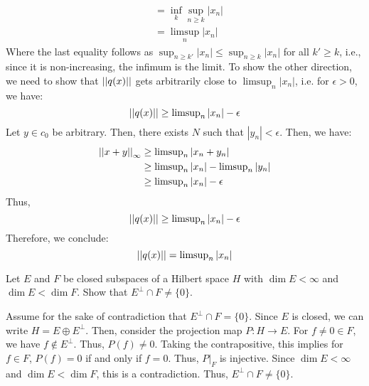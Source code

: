 \documentclass[12pt]{article}
\begin{document}
\begin{solution}
\begin{enumerate}
\begin{align*}
            &= \inf_k \sup_{n \geq k} |x_n| \\
            &= \limsup_n |x_n|
        \end{align*}
        Where the last equality follows as $\sup_{n \geq k'} |x_n| \leq \sup_{n \geq k} |x_n|$ for all $k' \geq k$, i.e., since it is non-increasing, the infimum is the limit.  \bbni
        To show the other direction, we need to show that $\left\vert\left\vert q(x)\right\vert\right\vert$ gets arbitrarily close to $\limsup_n |x_n|$, i.e. for $\epsilon > 0$, we have: 
        \[ \left\vert\left\vert q(x)\right\vert\right\vert \geq \operatorname{limsup}_n |x_n| - \epsilon\]
        Let $y \in c_0$ be arbitrary. Then, there exists $N$ such that $|y_n| < \epsilon$. Then, we have:
        \begin{align*}
            \left\vert\left\vert x+y\right\vert\right\vert_\infty &\geq \operatorname{limsup}_n |x_n + y_n| \\
            &\geq \operatorname{limsup}_n |x_n| - \operatorname{limsup}_n |y_n| \\
            &\geq \operatorname{limsup}_n |x_n| - \epsilon
        \end{align*}
        Thus,
        \[ \left\vert\left\vert q(x)\right\vert\right\vert \geq \operatorname{limsup}_n |x_n| - \epsilon\]
        Therefore, we conclude:
        \[ \left\vert\left\vert q(x)\right\vert\right\vert = \operatorname{limsup}_n |x_n|\]
    \end{enumerate}
\end{solution}
\newpage

\begin{problem}{5}
    Let $E$ and $F$ be closed subspaces of a Hilbert space $H$ with $\dim E < \infty$ and $\dim E < \dim F$. Show that $E^\perp \cap F \neq \{0\}$.
\end{problem}
\begin{solution}
    Assume for the sake of contradiction that $E^\perp \cap F = \{0\}$. Since $E$ is closed, we can write $H = E \oplus E^\perp$. Then, consider the projection map $P : H \to E$. For $f \neq 0 \in F$, we have $f \not\in E^\perp$. Thus, $P(f) \neq 0$. Taking the contrapositive, this implies for $f \in F$, $P(f) = 0$ if and only if $f = 0$. Thus, $P|_F$ is injective. Since $\dim E < \infty$ and $\dim E < \dim F$, this is a contradiction. Thus, $E^\perp \cap F \neq \{0\}$.
\end{solution}
\newpage
\end{document}
